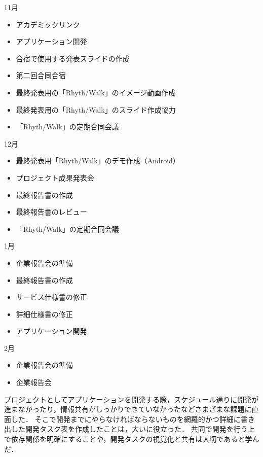 11月
\begin{itemize}
\item アカデミックリンク
\item アプリケーション開発
\item 合宿で使用する発表スライドの作成
\item 第二回合同合宿
\item 最終発表用の「Rhyth/Walk」のイメージ動画作成
\item 最終発表用の「Rhyth/Walk」のスライド作成協力
\item 「Rhyth/Walk」の定期合同会議
\end{itemize}
12月
\begin{itemize}
\item 最終発表用「Rhyth/Walk」のデモ作成（Android）
\item プロジェクト成果発表会
\item 最終報告書の作成
\item 最終報告書のレビュー
\item 「Rhyth/Walk」の定期合同会議
\end{itemize}
1月
\begin{itemize}
\item 企業報告会の準備
\item 最終報告書の作成
\item サービス仕様書の修正
\item 詳細仕様書の修正
\item アプリケーション開発
\end{itemize}
2月
\begin{itemize}
\item 企業報告会の準備
\item 企業報告会
\end{itemize}

\par
プロジェクトとしてアプリケーションを開発する際，スケジュール通りに開発が進まなかったり，情報共有がしっかりできていなかったなどさまざまな課題に直面した．
そこで開発までにやらなければならないものを網羅的かつ詳細に書き出した開発タスク表を作成したことは，大いに役立った．
共同で開発を行う上で依存関係を明確にすることや，開発タスクの視覚化と共有は大切であると学んだ．

